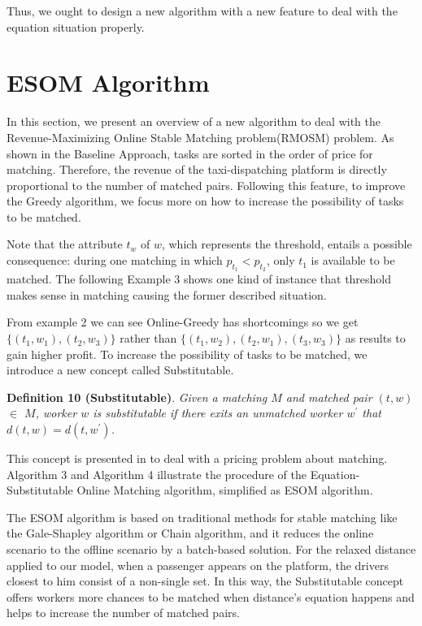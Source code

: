 \documentclass[color,twoside,amssymb,twocolumn]{article}
\begin{document}
Thus, we ought to design a new algorithm with a new feature to deal with the equation situation properly.


\section{ESOM Algorithm}

\noindent In this section, we present an overview of a new algorithm to deal with the Revenue-Maximizing Online Stable Matching problem(RMOSM) problem. As shown in the Baseline Approach, tasks are sorted in the order of price for matching. Therefore, the revenue of the taxi-dispatching platform is directly proportional to the number of matched pairs. Following this feature, to improve the Greedy algorithm, we focus more on how to increase the possibility of tasks to be matched.

Note that the attribute $t_w$ of $w$, which represents the threshold, entails a possible consequence: during one matching in which $p_{t_1} < p_{t_2}$, only $t_1$ is available to be matched. The following Example 3 shows one kind of instance that threshold makes sense in matching causing the former described situation.

From example 2 we can see Online-Greedy has shortcomings so we get $\{(t_1,w_1),(t_2,w_3)\}$ rather than $\{(t_1,w_2),(t_2,w_1),(t_3,w_3)\}$ as results to gain higher profit. To increase the possibility of tasks to be matched, we introduce a new concept called Substitutable.

\textbf{Definition 10 (Substitutable)\cite{xia2017revenue}}. {\it Given a matching $M$ and matched pair $(t,w)$ $\in$ $M$, worker $w$ is substitutable if there exits an unmatched worker $w^{'}$ that $d(t,w)=d(t,w^{'})$.
}

This concept is presented in \cite{xia2017revenue} to deal with a pricing problem about matching. Algorithm 3 and Algorithm 4 illustrate the procedure of the Equation-Substitutable Online Matching algorithm, simplified as ESOM algorithm.

The ESOM algorithm is based on traditional methods for stable matching like the Gale-Shapley algorithm or Chain algorithm, and it reduces the online scenario to the offline scenario by a batch-based solution. For the relaxed distance applied to our model, when a passenger appears on the platform, the drivers closest to him consist of a non-single set. In this way, the Substitutable concept offers workers more chances to be matched when distance's equation happens and helps to increase the number of matched pairs.
\end{document}
